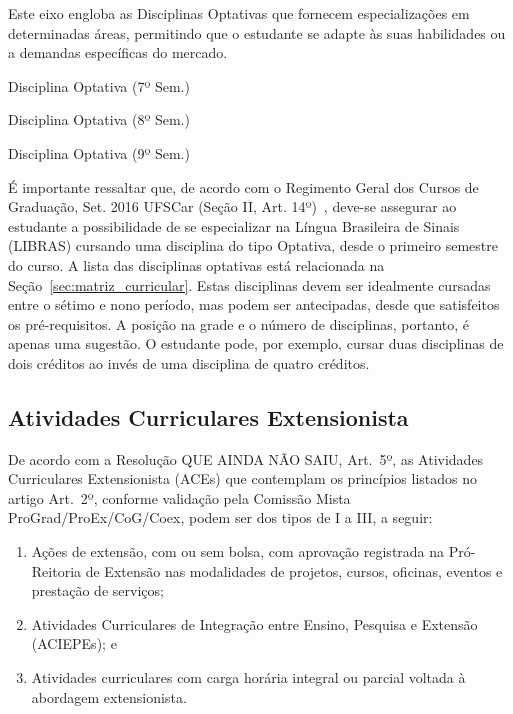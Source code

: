 Este eixo engloba as Disciplinas Optativas que fornecem especializações em determinadas áreas, permitindo que o estudante se adapte às suas habilidades ou a demandas específicas do mercado.

\begin{compenum}
    \item Disciplina Optativa (7º Sem.)
    \item Disciplina Optativa (8º Sem.)
    \item Disciplina Optativa (9º Sem.)

\end{compenum}

É importante ressaltar que, de acordo com o Regimento Geral dos Cursos de Graduação, Set. 2016 UFSCar (Seção II, Art. 14º)~\cite{RGCG}, deve-se assegurar ao estudante a possibilidade de se especializar na Língua Brasileira de Sinais (LIBRAS) cursando uma disciplina do tipo Optativa, desde o primeiro semestre do curso. A lista das disciplinas optativas está relacionada na Seção~\ref{sec:matriz_curricular}. Estas disciplinas devem ser idealmente cursadas entre o sétimo e nono período, mas podem ser antecipadas, desde que satisfeitos os pré-requisitos. A posição na grade e o número de disciplinas, portanto, é apenas uma sugestão. O estudante pode, por exemplo, cursar duas disciplinas de dois créditos ao invés de uma disciplina de quatro créditos.%


\subsection{Atividades Curriculares Extensionista}\label{sec:atividades-curriculares-extensionistas}

De acordo com a Resolução QUE AINDA NÃO SAIU, Art.~5º, as Atividades Curriculares Extensionista (ACEs) que contemplam os princípios listados no artigo Art.~2º, conforme validação pela Comissão Mista ProGrad/ProEx/CoG/Coex, podem ser dos tipos de I a III, a seguir:

\begin{enumerate}[label = \Roman*--]
    \item Ações de extensão, com ou sem bolsa, com aprovação registrada na Pró-Reitoria de Extensão nas modalidades de projetos, cursos, oficinas, eventos e prestação de serviços;
    \item Atividades Curriculares de Integração entre Ensino, Pesquisa e Extensão (ACIEPEs); e
    \item Atividades curriculares com carga horária integral ou parcial voltada à abordagem extensionista.
\end{enumerate}

